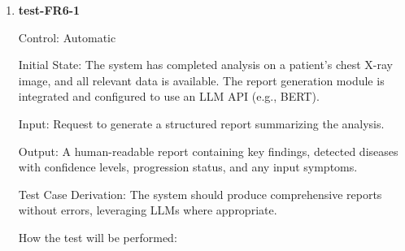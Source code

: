 \documentclass[12pt, titlepage]{article}
\begin{document}
\begin{enumerate}

\item \textbf{test-FR6-1} \label{test-FR6-1}

  Control: Automatic
  
  Initial State: The system has completed analysis on a patient's chest X-ray image, and all relevant data is available. The report generation module is integrated and configured to use an LLM API (e.g., BERT).
  
  Input: Request to generate a structured report summarizing the analysis.
  
  Output: A human-readable report containing key findings, detected diseases with confidence levels, progression status, and any input symptoms.
  
  Test Case Derivation: The system should produce comprehensive reports without errors, leveraging LLMs where appropriate.
  
  How the test will be performed:
  

\end{enumerate}
\end{document}
